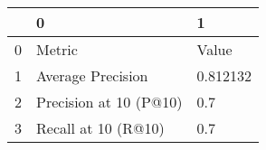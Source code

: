 \begin{tabular}{lll}
\toprule
{} &                       0 &         1 \\
\midrule
0 &                  Metric &     Value \\
1 &       Average Precision &  0.812132 \\
2 &  Precision at 10 (P@10) &       0.7 \\
3 &     Recall at 10 (R@10) &       0.7 \\
\bottomrule
\end{tabular}
